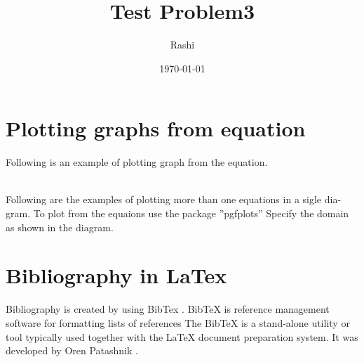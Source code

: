 \documentclass{article}
\begin{document}
	\title{Test Problem3}
	\author{Rashi}
	\date{\today}
	\maketitle
	\section{Plotting graphs from equation}
	Following is an example of plotting graph from the equation.\\
	\\
	Following are the examples of plotting more than one equations in a sigle dia-
	gram. To plot from the equaions use the package ”pgfplots” Specify the domain
	as shown in the diagram.

	
	\section{Bibliography in LaTex}
	
	Bibliography is created by using BibTex \cite{1}. BibTeX is reference management
	software for formatting lists of references \cite{2} The BibTeX is a stand-alone utility
	or tool typically used together with the LaTeX document preparation system.
	It was developed by Oren Patashnik \cite{3}.
	
	
\end{document}
